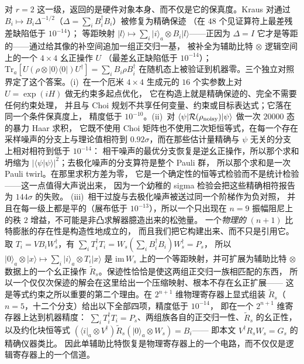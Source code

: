 \documentclass[11pt,a4paper]{article}
\newcommand{\ket}[1]{\lvert #1\rangle}
\newcommand{\bra}[1]{\langle #1\rvert}
\begin{document}
对 $r{=}2$ 这一级，返回的是硬件对象本身、而不仅是它的保真度。Kraus 对通过
$B_i\mapsto B_i\Delta^{-1/2}$（$\Delta=\sum_i B_i^\dagger B_i$）被修复为精确保迹
（在 $48$ 个见证算符上最差残差缺陷低于 $10^{-14}$）；
等距映射 $\ket l\mapsto\sum_i\ket i_a\otimes B_i\ket l$——正因为 $\Delta=I$
它才是等距的——通过给其像的补空间追加一组正交归一基，
被补全为辅助比特$\,\otimes\,$逻辑空间上的一个 $4\times4$ 幺正操作 $U$
（最差幺正缺陷低于 $10^{-14}$）；
$\mathrm{Tr}_a\!\left[U(\rho\otimes\ket0\bra0)U^\dagger\right]=\sum_i B_i\rho B_i^\dagger$
在随机态上被验证到机器零。三个独立对照界定了这个答案。(i)~在一个厄米
$4\times4$ 生成元的 $16$ 个实参数上对 $U=\exp(iH)$ 做无约束多起点优化，
它在构造上就是精确保迹的、完全不需要任何约束处理，
并且与 Choi 规划不共享任何变量、约束或目标表达式；它落在同一个条件保真度上，
精度低于 $10^{-10}$。(ii)~对
$\langle\psi|\mathcal R(\rho_{\rm noisy})|\psi\rangle$ 做一次 $20000$ 态的暴力 Haar 求积，
它既不使用 Choi 矩阵也不使用二次矩恒等式，在每一个存在采样噪声的分支上与理论值相符到
$0.92\sigma$，而在那些估计量精确与 $\psi$ 无关的分支上相对相符到低于 $10^{-14}$：
相干噪声的最优分支恢复是逆幺正操作，所以那个求和坍缩为
$|\langle\psi|\psi\rangle|^2$；去极化噪声的分支算符是整个 Pauli 群，
所以那个求和是一次 Pauli twirl。在那里求积方差为零，
它是一个确定性的恒等式检验而不是统计检验——这一点值得大声说出来，
因为一个幼稚的 sigma 检验会把这些精确相符报告为 $144\sigma$ 的失败。
(iii)~相干过旋与去极化噪声被送过同一个阶梯作为负对照，
并且在每一级上都是平的（展布低于 $10^{-13}$），所以一个只出现在 $n=9$
振幅阻尼上的秩 $2$ 增益，不可能是非凸求解器臆造出来的松弛量。
一个\emph{物理的} $(n{+}1)$ 比特膨胀的存在性是构造性地成立的，
而且我们把它构建出来、而不只是引用它。取 $T_i=VB_iW_s^\dagger$，有
$\sum_i T_i^\dagger T_i=W_s(\sum_iB_i^\dagger B_i)W_s^\dagger=P_s$，
所以 $\ket0_a\otimes\ket x\mapsto\sum_i\ket i_a\otimes T_i\ket x$
是 $\mathrm{im}\,W_s$ 上的一个等距映射，并可扩展为辅助比特$\,\otimes\,$数据上的一个幺正操作
$\tilde R_s$。保迹性恰恰是使这两组正交归一族相匹配的东西，
所以一个仅仅次保迹的解会在这里给出一个压缩映射、根本不存在幺正扩展——
这是等式约束之所以重要的第二个理由。在 $2^{n+1}$ 维物理寄存器上显式组装
$\tilde R_s$（$n{=}5$，十二个分支）给出以下全部四项，精度低于 $10^{-14}$，
即在一个 $2^{n+1}$ 维寄存器上达到机器精度：
$\sum_iT_i^\dagger T_i=P_s$、两组族各自的正交归一性、$\tilde R_s$ 的幺正性，
以及约化块恒等式
$(\bra i_a\otimes V^\dagger)\tilde R_s(\ket0_a\otimes W_s)=B_i$——
即本文 $V^\dagger R_sW_s=G_s$ 的精确仪器类比。
因此单辅助比特恢复是物理寄存器上的一个电路，而不仅仅是逻辑寄存器上的一个信道。
\end{document}
